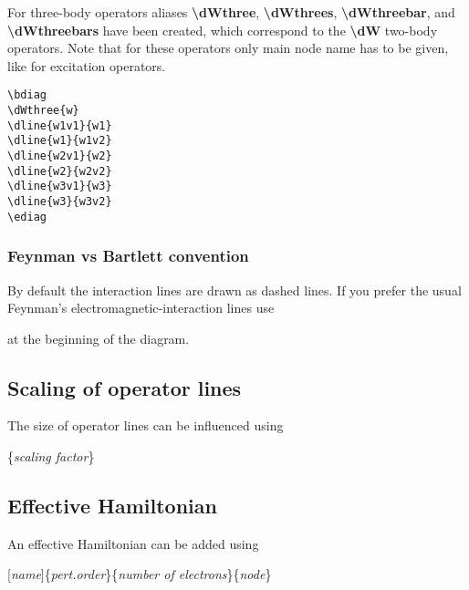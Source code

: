 \documentclass[a4paper]{article}
\newcommand{\myind}{\hspace{10pt}}
\begin{document}
For three-body operators aliases {\bf \textbackslash dWthree}, {\bf \textbackslash dWthrees},
{\bf \textbackslash dWthreebar}, and {\bf \textbackslash dWthreebars} have been created, which
correspond to the {\bf \textbackslash dW} two-body operators. Note that for these operators
only main node name has to be given, like for excitation operators.

 \begin{minipage}[b]{0.55\linewidth}\centering
  \begin{lstlisting}
\bdiag
\dWthree{w}
\dline{w1v1}{w1}
\dline{w1}{w1v2}
\dline{w2v1}{w2}
\dline{w2}{w2v2}
\dline{w3v1}{w3}
\dline{w3}{w3v2}
\ediag
  \end{lstlisting}
 \end{minipage}
 \begin{minipage}[b]{0.45\linewidth}\centering
\bdiag
{}
\ediag
 \end{minipage}

\subsubsection{Feynman vs Bartlett convention}

By default the interaction lines are drawn as dashed lines. If you prefer the 
usual Feynman's electromagnetic-interaction lines use

\myind{\bf \textbackslash dfeynman}

at the beginning of the diagram.

\subsection{Scaling of operator lines}

The size of operator lines can be influenced using

\myind{\bf \textbackslash dscaleop}\{{\it scaling factor}\}

\subsection{Effective Hamiltonian}

An effective Hamiltonian can be added using

\myind{\bf \textbackslash dHeff}[{\it name}]\{{\it pert.order}\}\{{\it number of electrons}\}\{{\it node}\}
\end{document}
